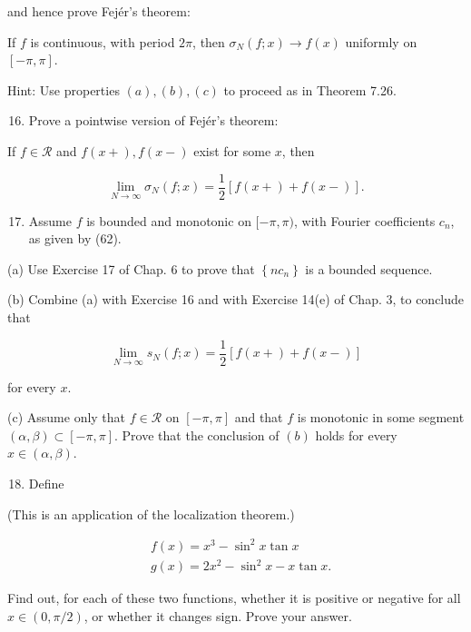 \documentclass[10pt]{article}
\begin{document}
and hence prove Fejér's theorem:

If $f$ is continuous, with period $2 \pi$, then $\sigma_{N}(f ; x) \rightarrow f(x)$ uniformly on $[-\pi, \pi]$.

Hint: Use properties $(a),(b),(c)$ to proceed as in Theorem 7.26.

\begin{enumerate}
  \setcounter{enumi}{15}
  \item Prove a pointwise version of Fejér's theorem:
\end{enumerate}

If $f \in \mathscr{R}$ and $f(x+), f(x-)$ exist for some $x$, then

$$
\lim _{N \rightarrow \infty} \sigma_{N}(f ; x)=\frac{1}{2}[f(x+)+f(x-)] .
$$

\begin{enumerate}
  \setcounter{enumi}{16}
  \item Assume $f$ is bounded and monotonic on $[-\pi, \pi)$, with Fourier coefficients $c_{n}$, as given by (62).
\end{enumerate}

(a) Use Exercise 17 of Chap. 6 to prove that $\left\{n c_{n}\right\}$ is a bounded sequence.

(b) Combine (a) with Exercise 16 and with Exercise 14(e) of Chap. 3, to conclude that

$$
\lim _{N \rightarrow \infty} s_{N}(f ; x)=\frac{1}{2}[f(x+)+f(x-)]
$$

for every $x$.

(c) Assume only that $f \in \mathscr{R}$ on $[-\pi, \pi]$ and that $f$ is monotonic in some segment $(\alpha, \beta) \subset[-\pi, \pi]$. Prove that the conclusion of $(b)$ holds for every $x \in(\alpha, \beta)$.

\begin{enumerate}
  \setcounter{enumi}{17}
  \item Define
\end{enumerate}

(This is an application of the localization theorem.)

$$
\begin{aligned}
& f(x)=x^{3}-\sin ^{2} x \tan x \\
& g(x)=2 x^{2}-\sin ^{2} x-x \tan x .
\end{aligned}
$$

Find out, for each of these two functions, whether it is positive or negative for all $x \in(0, \pi / 2)$, or whether it changes sign. Prove your answer.
\end{document}
